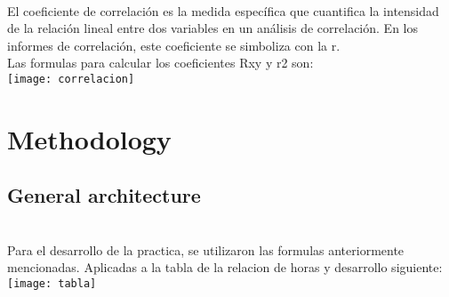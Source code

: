 \documentclass{article}
\begin{document}
{\\El coeficiente de correlación es la medida específica que cuantifica la intensidad de la relación lineal entre dos variables en un análisis de correlación. En los informes de correlación, este coeficiente se simboliza con la r.}
{\\Las formulas para calcular los coeficientes Rxy y r2 son: \\}
\texttt{[image: correlacion]}

\section{Methodology}
\subsection{General architecture}
{\\Para el desarrollo de la practica, se utilizaron las formulas anteriormente mencionadas. Aplicadas a la tabla de la relacion de horas y desarrollo siguiente:}
\texttt{[image: tabla]}
\end{document}
